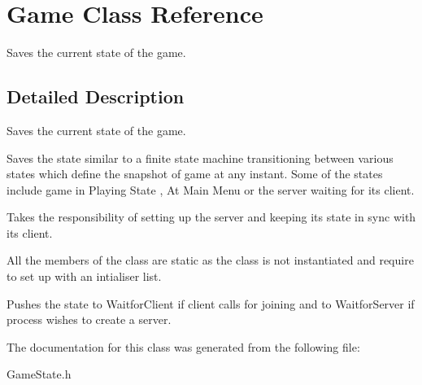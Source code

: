 \section{Game Class Reference}
\label{classGame}


Saves the current state of the game.  




\subsection{Detailed Description}
Saves the current state of the game. 

Saves the state similar to a finite state machine transitioning between various states which define the snapshot of game at any instant. Some of the states include game in Playing State , At Main Menu or the server waiting for its client.

Takes the responsibility of setting up the server and keeping it\textquotesingle{}s state in sync with it\textquotesingle{}s client.

All the members of the class are static as the class is not instantiated and require to set up with an intialiser list.

Pushes the state to Waitfor\+Client if client calls for joining and to Waitfor\+Server if process wishes to create a server. 

The documentation for this class was generated from the following file\+:\begin{DoxyCompactItemize}
\item 
Game\+State.\+h\end{DoxyCompactItemize}
